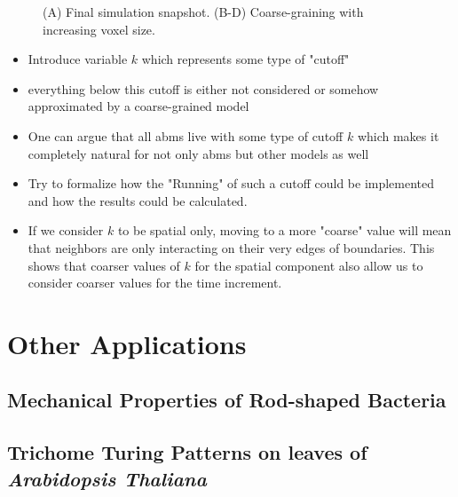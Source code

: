 \begin{figure}[h]
    \caption{
        (A) Final simulation snapshot.
        (B-D) Coarse-graining with increasing voxel size.
    }
    \label{fig:fractal-dimension-voxel-size}
\end{figure}

\begin{itemize}
    \item Introduce variable $k$ which represents some type of "cutoff"
    \item everything below this cutoff is either not considered or somehow approximated by a
        coarse-grained model
    \item One can argue that all \acp{abm} live with some type of cutoff $k$ which makes it
        completely natural for not only \acp{abm} but other models as well
    \item Try to formalize how the "Running" of such a cutoff could be implemented and how the
        results could be calculated.
    \item If we consider $k$ to be spatial only, moving to a more "coarse" value will mean that
        neighbors are only interacting on their very edges of boundaries.
        This shows that coarser values of $k$ for the spatial component also allow us to consider
        coarser values for the time increment.
\end{itemize}

\section{Other Applications}

\subsection{Mechanical Properties of Rod-shaped Bacteria}
\label{subsection:bacterial-rods}

\subsection{Trichome Turing Patterns on leaves of \textit{Arabidopsis Thaliana}}

% 

